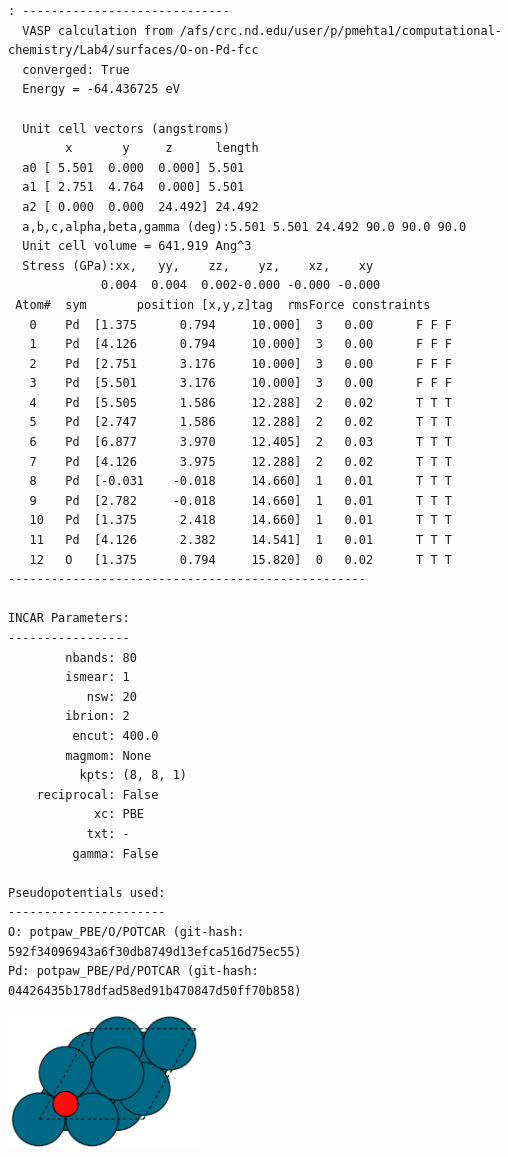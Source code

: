 \documentclass[11pt]{article}
\begin{document}
\begin{verbatim}
: -----------------------------
  VASP calculation from /afs/crc.nd.edu/user/p/pmehta1/computational-chemistry/Lab4/surfaces/O-on-Pd-fcc
  converged: True
  Energy = -64.436725 eV

  Unit cell vectors (angstroms)
        x       y     z      length
  a0 [ 5.501  0.000  0.000] 5.501
  a1 [ 2.751  4.764  0.000] 5.501
  a2 [ 0.000  0.000  24.492] 24.492
  a,b,c,alpha,beta,gamma (deg):5.501 5.501 24.492 90.0 90.0 90.0
  Unit cell volume = 641.919 Ang^3
  Stress (GPa):xx,   yy,    zz,    yz,    xz,    xy
             0.004  0.004  0.002-0.000 -0.000 -0.000
 Atom#  sym       position [x,y,z]tag  rmsForce constraints
   0    Pd  [1.375      0.794     10.000]  3   0.00      F F F
   1    Pd  [4.126      0.794     10.000]  3   0.00      F F F
   2    Pd  [2.751      3.176     10.000]  3   0.00      F F F
   3    Pd  [5.501      3.176     10.000]  3   0.00      F F F
   4    Pd  [5.505      1.586     12.288]  2   0.02      T T T
   5    Pd  [2.747      1.586     12.288]  2   0.02      T T T
   6    Pd  [6.877      3.970     12.405]  2   0.03      T T T
   7    Pd  [4.126      3.975     12.288]  2   0.02      T T T
   8    Pd  [-0.031    -0.018     14.660]  1   0.01      T T T
   9    Pd  [2.782     -0.018     14.660]  1   0.01      T T T
   10   Pd  [1.375      2.418     14.660]  1   0.01      T T T
   11   Pd  [4.126      2.382     14.541]  1   0.01      T T T
   12   O   [1.375      0.794     15.820]  0   0.02      T T T
--------------------------------------------------

INCAR Parameters:
-----------------
        nbands: 80
        ismear: 1
           nsw: 20
        ibrion: 2
         encut: 400.0
        magmom: None
          kpts: (8, 8, 1)
    reciprocal: False
            xc: PBE
           txt: -
         gamma: False

Pseudopotentials used:
----------------------
O: potpaw_PBE/O/POTCAR (git-hash: 592f34096943a6f30db8749d13efca516d75ec55)
Pd: potpaw_PBE/Pd/POTCAR (git-hash: 04426435b178dfad58ed91b470847d50ff70b858)
\end{verbatim}

\includegraphics[width=2in]{./images/Pd-slab-O-fcc.png}
\end{document}
